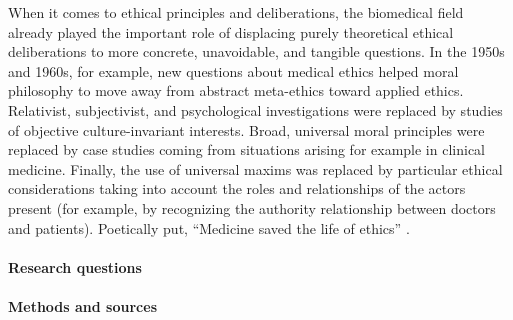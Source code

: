 When it comes to ethical principles and deliberations, the biomedical field already played the important role of displacing purely theoretical ethical deliberations to more concrete, unavoidable, and tangible questions.
In the 1950s and 1960s, for example, new questions about medical ethics helped moral philosophy to move away from abstract meta-ethics toward applied ethics.
Relativist, subjectivist, and psychological investigations were replaced by studies of objective culture-invariant interests.
Broad, universal moral principles were replaced by case studies coming from situations arising for example in clinical medicine.
Finally, the use of universal maxims was replaced by particular ethical considerations taking into account the roles and relationships of the actors present (for example, by recognizing the authority relationship between doctors and patients).
Poetically put, ``Medicine saved the life of ethics'' \cite{Toulmin1982}.

\paragraph{Research questions}

\paragraph{Methods and sources}

